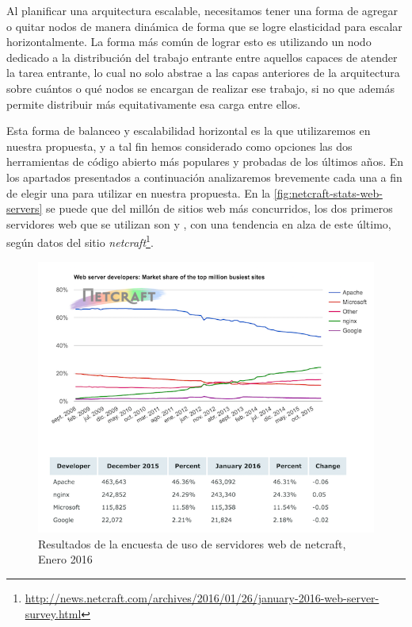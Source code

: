 Al planificar una arquitectura escalable, necesitamos tener una forma de agregar o quitar nodos de manera dinámica de forma que se logre elasticidad para escalar horizontalmente. La forma más común de lograr esto es utilizando un nodo dedicado a la distribución del trabajo entrante entre aquellos capaces de atender la tarea entrante, lo cual no solo abstrae a las capas anteriores de la arquitectura sobre cuántos o qué nodos se encargan de realizar ese trabajo, si no que además permite distribuir más equitativamente esa carga entre ellos.

Esta forma de balanceo y escalabilidad horizontal es la que utilizaremos en nuestra propuesta, y a tal fin hemos considerado como opciones las dos herramientas de código abierto más populares y probadas de los últimos años. En los apartados presentados a continuación analizaremos brevemente cada una a fin de elegir una para utilizar en nuestra propuesta. En la \autoref{fig:netcraft-stats-web-servers} se puede que del millón de sitios web más concurridos, los dos primeros servidores web que se utilizan son  y , con una tendencia en alza de este último, según datos del sitio \textit{netcraft}\footnote{\url{http://news.netcraft.com/archives/2016/01/26/january-2016-web-server-survey.html}}.

\begin{figure}[H]
  \includegraphics[width=\linewidth]{src/images/03-capitulo-3/tecnologias/balanceo/stats.png}
  \caption{Resultados de la encuesta de uso de servidores web de netcraft, Enero 2016}
  \label{fig:netcraft-stats-web-servers}
\end{figure}
